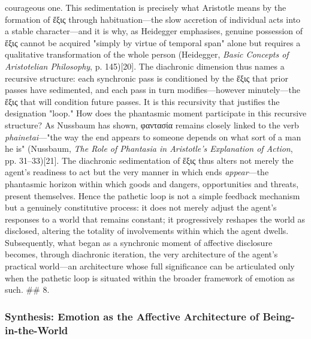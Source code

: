 \documentclass{article}
\begin{document}
courageous one. This sedimentation is precisely what Aristotle means by the formation of ἕξις through habituation—the slow accretion of individual acts into a stable character—and it is why, as Heidegger emphasises, genuine possession of ἕξις cannot be acquired "simply by virtue of temporal span" alone but requires a qualitative transformation of the whole person (Heidegger, \textit{Basic Concepts of Aristotelian Philosophy}, p. 145)[20]. The diachronic dimension thus names a recursive structure: each synchronic pass is conditioned by the ἕξις that prior passes have sedimented, and each pass in turn modifies—however minutely—the ἕξις that will condition future passes. It is this recursivity that justifies the designation "loop." How does the phantasmic moment participate in this recursive structure? As Nussbaum has shown, φαντασία remains closely linked to the verb \textit{phainetai}—"the way the end appears to someone depends on what sort of a man he is" (Nussbaum, \textit{The Role of Phantasia in Aristotle's Explanation of Action}, pp. 31–33)[21]. The diachronic sedimentation of ἕξις thus alters not merely the agent's readiness to act but the very manner in which ends \textit{appear}—the phantasmic horizon within which goods and dangers, opportunities and threats, present themselves. Hence the pathetic loop is not a simple feedback mechanism but a genuinely constitutive process: it does not merely adjust the agent's responses to a world that remains constant; it progressively reshapes the world as disclosed, altering the totality of involvements within which the agent dwells. Subsequently, what began as a synchronic moment of affective disclosure becomes, through diachronic iteration, the very architecture of the agent's practical world—an architecture whose full significance can be articulated only when the pathetic loop is situated within the broader framework of emotion as such. ## 8. 

\subsubsection*{Synthesis: Emotion as the Affective Architecture of Being-in-the-World}
\end{document}
